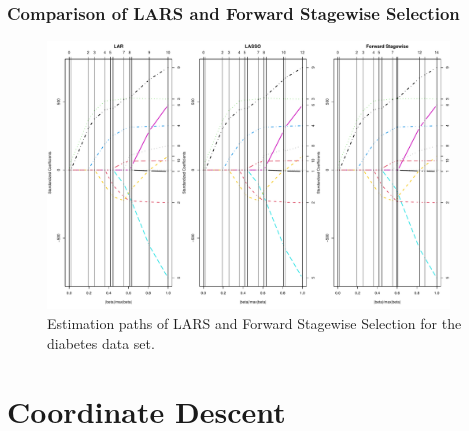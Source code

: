 \begin{frame}
    \frametitle{Comparison of LARS and Forward Stagewise Selection}
\begin{figure}[!htbp]
    \begin{center}
        \includegraphics[width=0.95\textwidth]{img/lars_diabetes.pdf}
    \end{center}
    \caption{Estimation paths of LARS and Forward Stagewise Selection for the diabetes data set.}
    \label{fig:lars_diabetes}
\end{figure}
\end{frame}

\section{Coordinate Descent}



